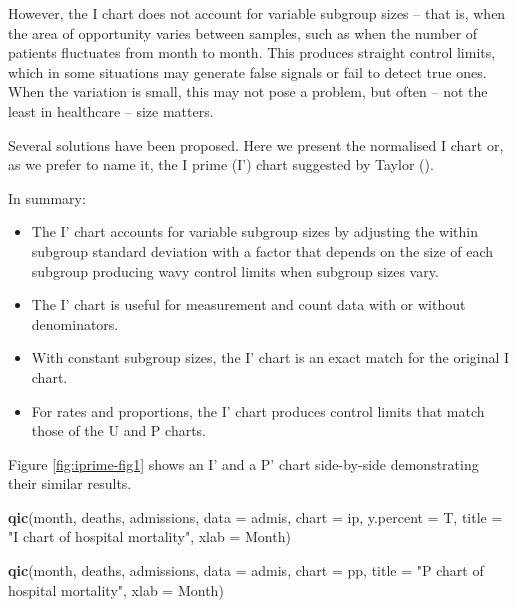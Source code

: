 \documentclass[
]{book}
\newenvironment{Shaded}{\begin{snugshade}}{\end{snugshade}}
\newcommand{\AttributeTok}[1]{\textcolor[rgb]{0.13,0.29,0.53}{#1}}
\newcommand{\FunctionTok}[1]{\textcolor[rgb]{0.13,0.29,0.53}{\textbf{#1}}}
\newcommand{\NormalTok}[1]{#1}
\newcommand{\StringTok}[1]{\textcolor[rgb]{0.31,0.60,0.02}{#1}}
\begin{document}
However, the I chart does not account for variable subgroup sizes -- that is, when the area of opportunity varies between samples, such as when the number of patients fluctuates from month to month. This produces straight control limits, which in some situations may generate false signals or fail to detect true ones. When the variation is small, this may not pose a problem, but often -- not the least in healthcare -- size matters.

Several solutions have been proposed. Here we present the normalised I chart or, as we prefer to name it, the I prime (I') chart suggested by Taylor ().

In summary:

\begin{itemize}
\item
  The I' chart accounts for variable subgroup sizes by adjusting the within subgroup standard deviation with a factor that depends on the size of each subgroup producing wavy control limits when subgroup sizes vary.
\item
  The I' chart is useful for measurement and count data with or without denominators.
\item
  With constant subgroup sizes, the I' chart is an exact match for the original I chart.
\item
  For rates and proportions, the I' chart produces control limits that match those of the U\textquotesingle{} and P\textquotesingle{} charts.
\end{itemize}

Figure \ref{fig:iprime-fig1} shows an I' and a P' chart side-by-side demonstrating their similar results.

\begin{Shaded}
\begin{Highlighting}[]
\FunctionTok{qic}\NormalTok{(month, deaths, admissions, }
    \AttributeTok{data      =}\NormalTok{ admis, }
    \AttributeTok{chart     =} \StringTok{\textquotesingle{}ip\textquotesingle{}}\NormalTok{, }
    \AttributeTok{y.percent =}\NormalTok{ T,}
    \AttributeTok{title     =} \StringTok{"I\textquotesingle{} chart of hospital mortality"}\NormalTok{,}
    \AttributeTok{xlab      =} \StringTok{\textquotesingle{}Month\textquotesingle{}}\NormalTok{)}

\FunctionTok{qic}\NormalTok{(month, deaths, admissions, }
    \AttributeTok{data  =}\NormalTok{ admis, }
    \AttributeTok{chart =} \StringTok{\textquotesingle{}pp\textquotesingle{}}\NormalTok{,}
    \AttributeTok{title =} \StringTok{"P\textquotesingle{} chart of hospital mortality"}\NormalTok{,}
    \AttributeTok{xlab  =} \StringTok{\textquotesingle{}Month\textquotesingle{}}\NormalTok{)}
\end{Highlighting}
\end{Shaded}
\end{document}
